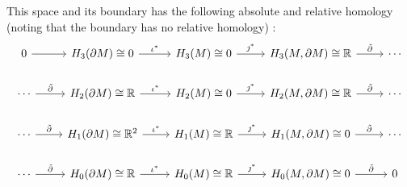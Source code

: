 \documentclass{article}
\begin{document}
This space and its boundary has the following absolute and relative homology (noting that the boundary has no relative homology) :
\[
\begin{tikzcd}
0 \arrow[r]                          & H_3(\partial M)\cong 0 \arrow[r, "\iota^*"]            & H_3(M)\cong 0 \arrow[r, "\jmath^*"]          & {H_3(M,\partial M)\cong \R} \arrow[r, "\tilde{\partial}"]          & \cdots \\
\cdots \arrow[r, "\tilde{\partial}"] & H_2(\partial M)\cong \mathbb{R} \arrow[r, "\iota^*"]   & H_2(M) \cong 0 \arrow[r, "\jmath^*"]         & {H_2(M,\partial M)\cong \mathbb{R}} \arrow[r, "\tilde{\partial}"] & \cdots \\
\cdots \arrow[r, "\tilde{\partial}"] & H_1(\partial M)\cong \mathbb{R}^2 \arrow[r, "\iota^*"] & H_1(M)\cong \mathbb{R} \arrow[r, "\jmath^*"] & {H_1(M,\partial M)\cong 0} \arrow[r, "\tilde{\partial}"]          & \cdots \\
\cdots \arrow[r, "\tilde{\partial}"] & H_0(\partial M)\cong \mathbb{R} \arrow[r, "\iota^*"]   & H_0(M)\cong \mathbb{R} \arrow[r, "\jmath^*"] & {H_0(M,\partial M)\cong 0} \arrow[r, "\tilde{\partial}"]          & 0     
\end{tikzcd}
\]
\end{document}
